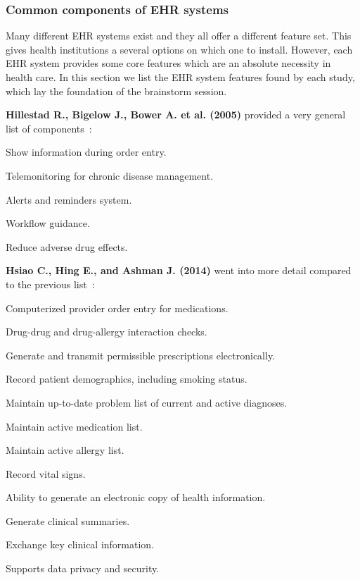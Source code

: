         \subsubsection{Common components of EHR systems}

        Many different EHR systems exist and they all offer a different feature set. This gives health institutions a several options on which one to install. However, each EHR system provides some core features which are an absolute necessity in health care. In this section we list the EHR system features found by each study, which lay the foundation of the brainstorm session.\bigskip

        \noindent \textbf{Hillestad R., Bigelow J., Bower A. et al. (2005)} provided a very general list of components~\cite{Hillestad2005}:
        \vspace{-\topsep}
        \begin{multicols}{2}
            \begin{myitemize}
                \item Show information during order entry.
                \item Telemonitoring for chronic disease management.
                \item Alerts and reminders system.
                \item Workflow guidance.
                \item Reduce adverse drug effects.
            \end{myitemize}
        \end{multicols}

        \noindent \textbf{Hsiao C., Hing E., and Ashman J. (2014)} went into more detail compared to the previous list~\cite{Hsiao2014}:
        \vspace{-0.5\topsep}
        \begin{myitemize}
            \item Computerized provider order entry for medications.
            \item Drug-drug and drug-allergy interaction checks.
            \item Generate and transmit permissible prescriptions electronically.
            \item Record patient demographics, including smoking status.
            \item Maintain up-to-date problem list of current and active diagnoses.
            \item Maintain active medication list.
            \item Maintain active allergy list.
            \item Record vital signs.
            \item Ability to generate an electronic copy of health information.
            \item Generate clinical summaries.
            \item Exchange key clinical information.
            \item Supports data privacy and security.
        \end{myitemize}

